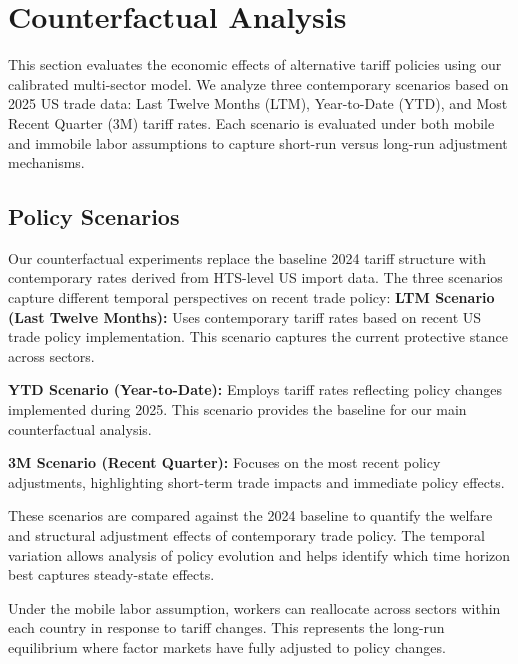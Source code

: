 \section{Counterfactual Analysis}

This section evaluates the economic effects of alternative tariff policies using our calibrated multi-sector model. We analyze three contemporary scenarios based on 2025 US trade data: Last Twelve Months (LTM), Year-to-Date (YTD), and Most Recent Quarter (3M) tariff rates. Each scenario is evaluated under both mobile and immobile labor assumptions to capture short-run versus long-run adjustment mechanisms.

\subsection{Policy Scenarios}

Our counterfactual experiments replace the baseline 2024 tariff structure with contemporary rates derived from HTS-level US import data. The three scenarios capture different temporal perspectives on recent trade policy:
\textbf{LTM Scenario (Last Twelve Months):} Uses contemporary tariff rates based on recent US trade policy implementation. This scenario captures the current protective stance across sectors.

\textbf{YTD Scenario (Year-to-Date):} Employs tariff rates reflecting policy changes implemented during 2025. This scenario provides the baseline for our main counterfactual analysis.

\textbf{3M Scenario (Recent Quarter):} Focuses on the most recent policy adjustments, highlighting short-term trade impacts and immediate policy effects.

These scenarios are compared against the 2024 baseline to quantify the welfare and structural adjustment effects of contemporary trade policy. The temporal variation allows analysis of policy evolution and helps identify which time horizon best captures steady-state effects.

\begin{landscape}
    \vspace*{\fill}
    
    \vspace*{\fill}
\end{landscape}
Under the mobile labor assumption, workers can reallocate across sectors within each country in response to tariff changes. This represents the long-run equilibrium where factor markets have fully adjusted to policy changes.

